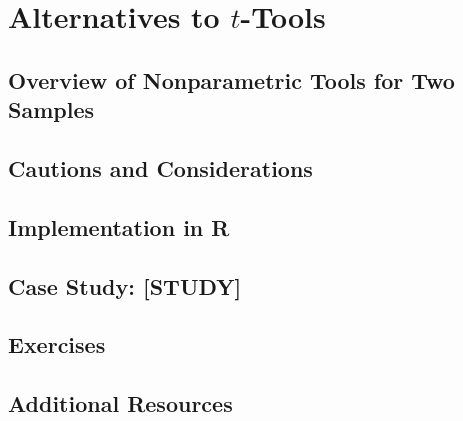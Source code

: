
\chapter{Alternatives to $t$-Tools}

\section{Overview of Nonparametric Tools for Two Samples}

\section{Cautions and Considerations}

\section{Implementation in R}

\section{Case Study: [STUDY]}

\section{Exercises}

\section{Additional Resources}
